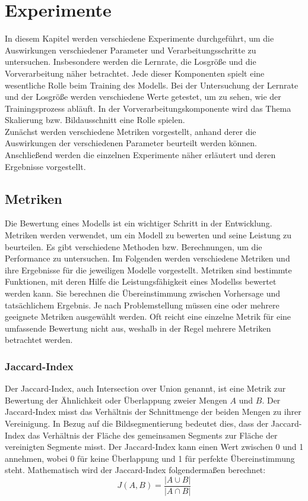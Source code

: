 \chapter{Experimente}
In diesem Kapitel werden verschiedene Experimente durchgeführt, um die Auswirkungen verschiedener Parameter und Verarbeitungsschritte zu untersuchen. Insbesondere werden die Lernrate, die Losgröße und die Vorverarbeitung näher betrachtet. Jede dieser Komponenten spielt eine wesentliche Rolle beim Training des \gls{Modell}s. Bei der Untersuchung der Lernrate und der Losgröße werden verschiedene Werte getestet, um zu sehen, wie der Trainingsprozess abläuft. In der Vorverarbeitungskomponente wird das Thema Skalierung bzw. Bildausschnitt eine Rolle spielen.\\
Zunächst werden verschiedene Metriken vorgestellt, anhand derer die Auswirkungen der verschiedenen Parameter beurteilt werden können. Anschließend werden die einzelnen Experimente näher erläutert und deren Ergebnisse vorgestellt.

\section{Metriken}
Die Bewertung eines \gls{Modell}s ist ein wichtiger Schritt in der Entwicklung. Metriken werden verwendet, um ein \gls{Modell} zu bewerten und seine Leistung zu beurteilen. Es gibt verschiedene Methoden bzw. Berechnungen, um die Performance zu untersuchen. Im Folgenden werden verschiedene Metriken und ihre Ergebnisse für die jeweiligen \gls{Modell}e vorgestellt.
Metriken sind bestimmte Funktionen, mit deren Hilfe die Leistungsfähigkeit eines \glspl{Modell}s bewertet werden kann. Sie berechnen die Übereinstimmung zwischen Vorhersage und tatsächlichem Ergebnis. Je nach Problemstellung müssen eine oder mehrere geeignete Metriken ausgewählt werden. Oft reicht eine einzelne Metrik für eine umfassende Bewertung nicht aus, weshalb in der Regel mehrere Metriken betrachtet werden.
\subsection{Jaccard-Index}
Der Jaccard-Index, auch Intersection over Union genannt, ist eine Metrik zur Bewertung der Ähnlichkeit oder Überlappung zweier Mengen $A$ und $B$. Der Jaccard-Index misst das Verhältnis der Schnittmenge der beiden Mengen zu ihrer Vereinigung. In Bezug auf die Bildsegmentierung bedeutet dies, dass der Jaccard-Index das Verhältnis der Fläche des gemeinsamen Segments zur Fläche der vereinigten Segmente misst. Der Jaccard-Index kann einen Wert zwischen 0 und 1 annehmen, wobei 0 für keine Überlappung und 1 für perfekte Übereinstimmung steht. Mathematisch wird der Jaccard-Index folgendermaßen berechnet: \cite[vgl.][]{GarciaGarcia2017}
\begin{equation}
	J(A,B) =  \dfrac{\vert A \cup B\vert }{\vert A \cap B\vert}
\end{equation} 

